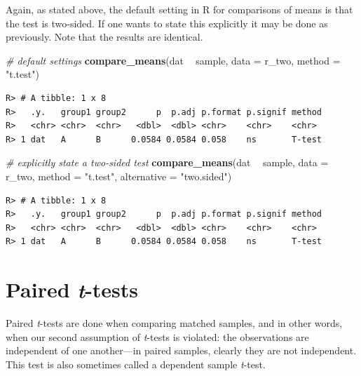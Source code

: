 \documentclass[english,10pt,a4paper,oneside]{book}
\newenvironment{Shaded}{\begin{snugshade}}{\end{snugshade}}
\newcommand{\CommentTok}[1]{\textcolor[rgb]{0.56,0.35,0.01}{\textit{#1}}}
\newcommand{\DataTypeTok}[1]{\textcolor[rgb]{0.13,0.29,0.53}{#1}}
\newcommand{\KeywordTok}[1]{\textcolor[rgb]{0.13,0.29,0.53}{\textbf{#1}}}
\newcommand{\NormalTok}[1]{#1}
\newcommand{\OperatorTok}[1]{\textcolor[rgb]{0.81,0.36,0.00}{\textbf{#1}}}
\newcommand{\StringTok}[1]{\textcolor[rgb]{0.31,0.60,0.02}{#1}}
\theoremstyle{definition}
\theoremstyle{definition}
\theoremstyle{definition}
\theoremstyle{remark}
\begin{document}
Again, as stated above, the default setting in R for comparisons of
means is that the test is two-sided. If one wants to state this
explicitly it may be done as previously. Note that the results are
identical.

\begin{Shaded}
\begin{Highlighting}[]
\CommentTok{# default settings}
\KeywordTok{compare_means}\NormalTok{(dat }\OperatorTok{~}\StringTok{ }\NormalTok{sample, }\DataTypeTok{data =}\NormalTok{ r_two, }\DataTypeTok{method =} \StringTok{"t.test"}\NormalTok{)}
\end{Highlighting}
\end{Shaded}

\begin{verbatim}
R> # A tibble: 1 x 8
R>   .y.   group1 group2      p  p.adj p.format p.signif method
R>   <chr> <chr>  <chr>   <dbl>  <dbl> <chr>    <chr>    <chr> 
R> 1 dat   A      B      0.0584 0.0584 0.058    ns       T-test
\end{verbatim}

\begin{Shaded}
\begin{Highlighting}[]
\CommentTok{# explicitly state a two-sided test}
\KeywordTok{compare_means}\NormalTok{(dat }\OperatorTok{~}\StringTok{ }\NormalTok{sample, }\DataTypeTok{data =}\NormalTok{ r_two, }\DataTypeTok{method =} \StringTok{"t.test"}\NormalTok{, }\DataTypeTok{alternative =} \StringTok{"two.sided"}\NormalTok{)}
\end{Highlighting}
\end{Shaded}

\begin{verbatim}
R> # A tibble: 1 x 8
R>   .y.   group1 group2      p  p.adj p.format p.signif method
R>   <chr> <chr>  <chr>   <dbl>  <dbl> <chr>    <chr>    <chr> 
R> 1 dat   A      B      0.0584 0.0584 0.058    ns       T-test
\end{verbatim}

\hypertarget{paired-t-tests}{%
\section{\texorpdfstring{Paired
\emph{t}-tests}{Paired t-tests}}\label{paired-t-tests}}

Paired \emph{t}-tests are done when comparing matched samples, and in
other words, when our second assumption of \emph{t}-tests is violated:
the observations are independent of one another---in paired samples,
clearly they are not independent. This test is also sometimes called a
dependent sample \emph{t}-test.
\end{document}
